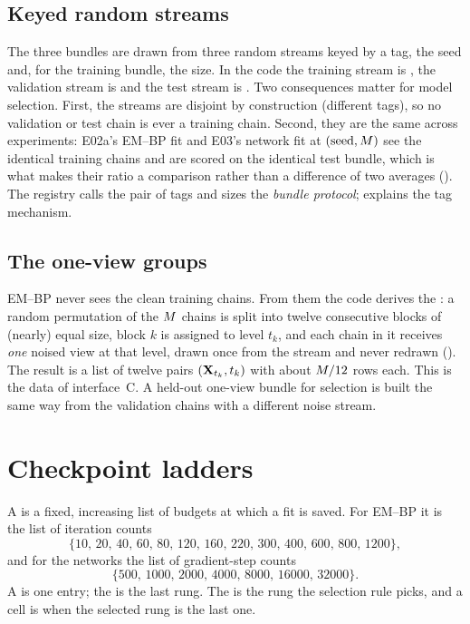 \subsection{Keyed random streams}

The three bundles are drawn from three random streams keyed by a tag, the seed and, for
the training bundle, the size. In the code the training stream is
, the validation stream is
 and the test stream is
. Two consequences
matter for model selection. First, the streams are disjoint by construction (different
tags), so no validation or test chain is ever a training chain. Second, they are the
same across experiments: E02a's EM--BP fit and E03's network fit at $(\text{seed},M)$
see the identical training chains and are scored on the identical test bundle, which is
what makes their ratio a  comparison rather than a difference of two
averages (). The registry calls the pair of tags and
sizes the \emph{bundle protocol};  explains the tag mechanism.

\subsection{The one-view groups}

EM--BP never sees the clean training chains. From them the code derives the
: a random permutation of the $M$ chains is split into twelve
consecutive blocks of (nearly) equal size, block $k$ is assigned to level $t_k$, and
each chain in it receives \emph{one} noised view at that level, drawn once from the
stream  and never redrawn
(). The result is a list of twelve pairs
$(\mathbf{X}_{t_k},t_k)$ with about $M/12$ rows each. This is the data of interface~C.
A held-out one-view bundle for selection is built the same way from the validation
chains with a different noise stream.

\section{Checkpoint ladders}
\label{sec:ladders}

\begin{definition}
\label{def:ladder}
A  is a fixed, increasing list of budgets at which a fit is
saved. For EM--BP it is the list of iteration counts
\begin{equation}
  \{10,\,20,\,40,\,60,\,80,\,120,\,160,\,220,\,300,\,400,\,600,\,800,\,1200\},
\end{equation}
and for the networks the list of gradient-step counts
\begin{equation}
  \{500,\,1000,\,2000,\,4000,\,8000,\,16000,\,32000\}.
\end{equation}
A  is one entry; the
 is the last rung. The  is the rung the selection
rule picks, and a cell is  when the selected rung is the last one.
\end{definition}

